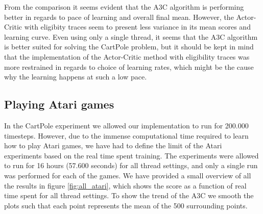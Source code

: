 \documentclass[11pt]{article}
\begin{document}
From the comparison it seems evident that the A3C algorithm is performing
better in regards to pace of learning and overall final mean.
However, the Actor-Critic with eligibity traces seem to present less variance
in its mean scores and learning curve.
Even using only a single thread, it seems that the A3C algorithm
is better suited for solving the CartPole problem, but it should
be kept in mind that the implementation of the Actor-Critic method
with eligibility traces was more restrained in regards to choice of
learning rates, which might be the cause why the learning happens
at such a low pace.

\subsection{Playing Atari games}

In the CartPole experiment we allowed our implementation to run for 200.000 timesteps.
However, due to the immense computational time required to
learn how to play Atari games, we have had to define the limit of the
Atari experiments based on the real time spent training.
The experiments were allowed to run for 16 hours (57.600 seconds)
for all thread settings, and only a single run was performed for
each of the games.
We have provided a small overview of all the results in figure \ref{fig:all_atari},
which shows the score as a function of real time spent for all
thread settings.
To show the trend of the A3C we smooth the plots such that
each point represents the mean of the 500 surrounding points.
\end{document}
